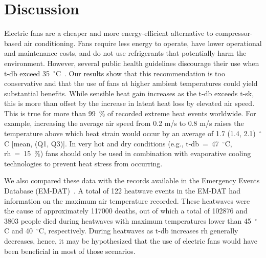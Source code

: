 
\section{Discussion}\label{sec:discussion}

Electric fans are a cheaper and more energy-efficient alternative to compressor-based air conditioning.
Fans require less energy to operate, have lower operational and maintenance costs, and do not use refrigerants that potentially harm the environment.
However, several public health guidelines discourage their use when \acf{t-db} exceed 35~$^{\circ}$C~\cite{WMO2015}.
Our results show that this recommendation is too conservative and that the use of fans at higher ambient temperatures could yield substantial benefits.
While sensible heat gain increases as the \ac{t-db} exceeds \acf{t-sk}, this is more than offset by the increase in latent heat loss by elevated air speed. 
This is true for more than 99~\% of recorded extreme heat events worldwide.
For example, increasing the average air speed from 0.2 m/s to 0.8 m/s raises the temperature above which heat strain would occur by an average of 1.7 (1.4, 2.1)~$^{\circ}$C [mean, (Q1, Q3)].
In very hot and dry conditions (e.g., \ac{t-db}~=~47~$^{\circ}$C, \ac{rh}~=~15~\%) fans should only be used in combination with evaporative cooling technologies to prevent heat stress from occurring.

We also compared these data with the records available in the Emergency Events Database (EM-DAT)~\cite{EMDATThe70:online}.
A total of 122 heatwave events in the EM-DAT had information on the maximum air temperature recorded.
These heatwaves were the cause of approximately 117000 deaths, out of which a total of 102876 and 3803 people died during heatwaves with maximum temperatures lower than 45~$^{\circ}$C and 40~$^{\circ}$C, respectively.
During heatwaves as \ac{t-db} increases \ac{rh} generally decreases, hence, it may be hypothesized that the use of electric fans would have been beneficial in most of those scenarios.

